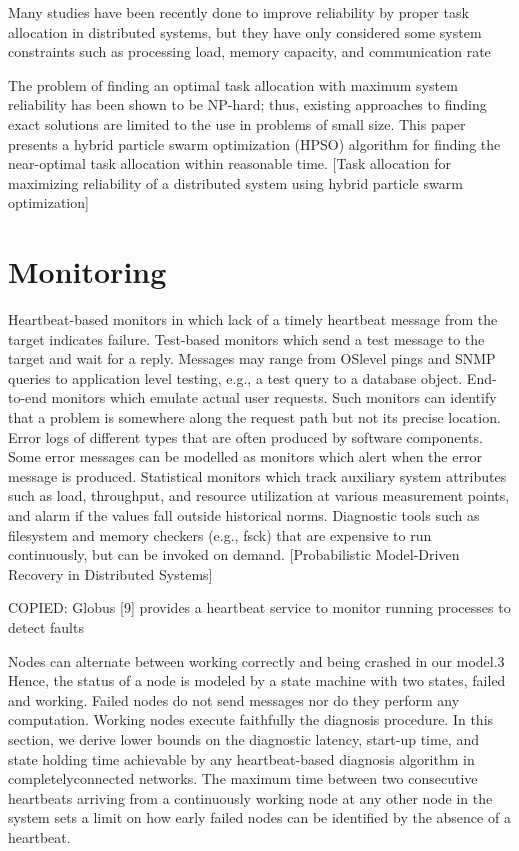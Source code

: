 \documentclass{cslthse-msc}
\begin{document}
\cite{schedReplicas}

Many studies have been recently done to improve reliability by proper task allocation in distributed systems, but they have only considered some system constraints such as processing load, memory capacity, and communication rate \cite{optTaskAllocationForMaxRel}

The problem of finding an optimal task allocation with maximum system reliability has been shown to be NP-hard; thus, existing approaches to finding exact solutions are limited to the use in problems of small size. This paper presents a hybrid particle swarm optimization (HPSO) algorithm for finding the near-optimal task allocation within reasonable time. [Task allocation for maximizing reliability of a distributed system using hybrid particle swarm optimization]

\section{Monitoring}
Heartbeat-based monitors in which lack of a timely heartbeat message from the target indicates failure.
Test-based monitors which send a test message to the target and wait for a reply. Messages may range from OSlevel pings and SNMP queries to application level testing, e.g., a test query to a database object.
End-to-end monitors which emulate actual user requests. Such monitors can identify that a problem is somewhere along the request path but not its precise location.
Error logs of different types that are often produced by software components. Some error messages can be modelled as monitors which alert when the error message is produced.
Statistical monitors which track auxiliary system attributes such as load, throughput, and resource utilization at various measurement points, and alarm if the values fall outside historical norms.
Diagnostic tools such as filesystem and memory checkers (e.g., fsck) that are expensive to run continuously, but can be invoked on demand. [Probabilistic Model-Driven Recovery in Distributed Systems]

COPIED:
Globus [9] provides a heartbeat service to monitor running processes to detect faults  \cite{effTaskReplMobGrid}

Nodes can alternate between working correctly and being crashed in our model.3 Hence, the status of a node is modeled by a state machine with two states, failed and working. Failed nodes do not send messages nor do they perform any computation. Working nodes execute faithfully the diagnosis procedure. In this section, we derive lower bounds on the diagnostic
latency, start-up time, and state holding time achievable by any heartbeat-based diagnosis algorithm in completelyconnected networks. The maximum time between two consecutive heartbeats arriving from a continuously working node at any other node in the system sets a limit on how early failed nodes can be identified by the absence of a heartbeat. \cite{distDiagnosis}
\end{document}
